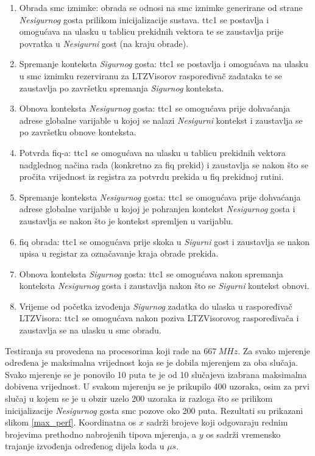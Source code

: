 \documentclass[times, utf8, diplomski, numeric]{fer}
\begin{document}
\begin{enumerate}
  \item{Obrada \gls{smc} iznimke: obrada se odnosi na \gls{smc} iznimke generirane od strane \textit{Nesigurnog} gosta prilikom
  inicijalizacije sustava. \gls{ttc}1 se postavlja i omogućava na ulasku u tablicu prekidnih vektora te se zaustavlja prije
  povratka u \textit{Nesigurni} gost (na kraju obrade).}
  \item{Spremanje konteksta \textit{Sigurnog} gosta: \gls{ttc}1 se postavlja i omogućava na ulasku u \gls{smc} iznimku rezerviranu
  za LTZVisorov raspoređivač zadataka te se zaustavlja po završetku spremanja \textit{Sigurnog} konteksta.}
  \item{Obnova konteksta \textit{Nesigurnog} gosta: \gls{ttc}1 se omogućava prije dohvaćanja adrese globalne varijable u kojoj
  se nalazi \textit{Nesigurni} kontekst i zaustavlja se po završetku obnove konteksta.}
  \item{Potvrda \gls{fiq}-a: \gls{ttc}1 se omogućava na ulasku u tablicu prekidnih vektora nadglednog načina rada (konkretno za
  \gls{fiq} prekid) i zaustavlja se nakon što se pročita vrijednost iz registra za potvrdu prekida u \gls{fiq} prekidnoj rutini.}
  \item{Spremanje konteksta \textit{Nesigurnog} gosta: \gls{ttc}1 se omogućava prije dohvaćanja adrese globalne varijable u kojoj
  je pohranjen kontekst \textit{Nesigurnog} gosta i zaustavlja se nakon što je kontekst spremljen u varijablu.}
  \item{\gls{fiq} obrada: \gls{ttc}1 se omogućava prije skoka u \textit{Sigurni} gost i zaustavlja se nakon upisa u registar za
  označavanje kraja obrade prekida.}
  \item{Obnova konteksta \textit{Sigurnog} gosta: \gls{ttc}1 se omogućava nakon spremanja konteksta \textit{Nesigurnog} gosta
  i zaustavlja nakon što se \textit{Sigurni} kontekst obnovi.}
  \item{Vrijeme od početka izvođenja \textit{Sigurnog} zadatka do ulaska u raspoređivač LTZVisora: \gls{ttc}1 se omogućava
  nakon poziva LTZVisorovog raspoređivača i zaustavlja se na ulasku u \gls{smc} obradu.}
\end{enumerate}
Testiranja su provedena na procesorima koji rade na $667~MHz$. Za svako mjerenje određena je maksimalna vrijednost
koja se je dobila mjerenjem za oba slučaja. Svako mjerenje se je ponovilo 10 puta te je od 10 slučajeva izabrana
maksimalna dobivena vrijednost. U svakom mjerenju se je prikupilo 400 uzoraka, osim za prvi slučaj u kojem se je u
obzir uzelo 200 uzoraka iz razloga što se prilikom inicijalizacije \textit{Nesigurnog} gosta \gls{smc} pozove oko 200 puta.
Rezultati su prikazani slikom \ref{max_perf}. Koordinatna
os $x$ sadrži brojeve koji odgovaraju rednim brojevima prethodno nabrojenih tipova mjerenja, a $y$ os sadrži vremensko
trajanje izvođenja određenog dijela koda u $\mu s$.
\end{document}
